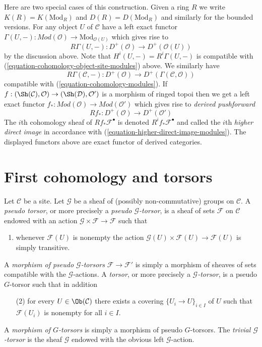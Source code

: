 \medskip\noindent
Here are two special cases of this construction. Given a ring $R$ we write
$K(R) = K(\text{Mod}_R)$ and $D(R) = D(\text{Mod}_R)$ and similarly for the
bounded versions. For any object $U$ of $\mathcal{C}$ have a left exact functor
$
\Gamma(U, -) :
\textit{Mod}(\mathcal{O})
\longrightarrow
\text{Mod}_{\mathcal{O}(U)}
$
which gives rise to
$$
R\Gamma(U, -) :
D^{+}(\mathcal{O})
\longrightarrow
D^{+}(\mathcal{O}(U))
$$
by the discussion above. Note that $H^i(U, -) = R^i\Gamma(U, -)$
is compatible with (\ref{equation-cohomology-object-site-modules}) above.
We similarly have
$$
R\Gamma(\mathcal{C}, -) :
D^{+}(\mathcal{O})
\longrightarrow
D^{+}(\Gamma(\mathcal{C}, \mathcal{O}))
$$
compatible with (\ref{equation-cohomology-modules}). If
$f : (\Sh(\mathcal{C}), \mathcal{O}) \to (\Sh(\mathcal{D}), \mathcal{O}')$
is a morphism of ringed topoi then we get a left exact functor
$f_* : \textit{Mod}(\mathcal{O}) \to \textit{Mod}(\mathcal{O}')$
which gives rise to {\it derived pushforward}
$$
Rf_* : D^{+}(\mathcal{O}) \to D^+(\mathcal{O}')
$$
The $i$th cohomology sheaf of $Rf_*\mathcal{F}^\bullet$ is denoted
$R^if_*\mathcal{F}^\bullet$ and called the $i$th {\it higher direct image}
in accordance with (\ref{equation-higher-direct-image-modules}).
The displayed functors above are exact functor
of derived categories.







\section{First cohomology and torsors}
\label{section-h1-torsors}

\begin{definition}
\label{definition-torsor}
Let $\mathcal{C}$ be a site.
Let $\mathcal{G}$ be a sheaf of (possibly non-commutative)
groups on $\mathcal{C}$.
A {\it pseudo torsor}, or more precisely a
{\it pseudo $\mathcal{G}$-torsor}, is a sheaf
of sets $\mathcal{F}$ on $\mathcal{C}$ endowed with an action
$\mathcal{G} \times \mathcal{F} \to \mathcal{F}$ such that
\begin{enumerate}
\item whenever $\mathcal{F}(U)$ is nonempty the action
$\mathcal{G}(U) \times \mathcal{F}(U) \to \mathcal{F}(U)$
is simply transitive.
\end{enumerate}
A {\it morphism of pseudo $\mathcal{G}$-torsors}
$\mathcal{F} \to \mathcal{F}'$
is simply a morphism of sheaves of sets compatible with the
$\mathcal{G}$-actions.
A {\it torsor}, or more precisely a
{\it $\mathcal{G}$-torsor}, is a pseudo $G$-torsor such that
in addition
\begin{enumerate}
\item[(2)] for every $U \in \Ob(\mathcal{C})$
there exists a covering $\{U_i \to U\}_{i \in I}$ of $U$
such that $\mathcal{F}(U_i)$ is nonempty for all $i \in I$.
\end{enumerate}
A {\it morphism of $G$-torsors} is simply a morphism of
pseudo $G$-torsors.
The {\it trivial $\mathcal{G}$-torsor}
is the sheaf $\mathcal{G}$ endowed with the obvious left
$\mathcal{G}$-action.
\end{definition}

